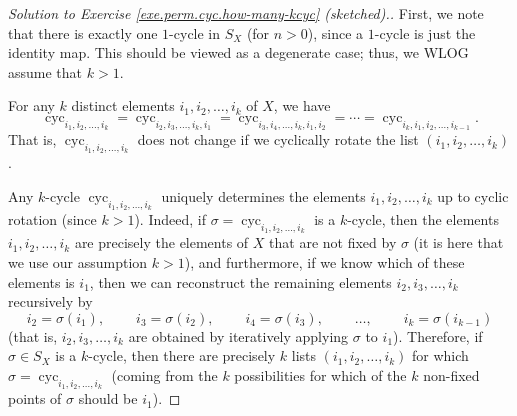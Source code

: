 \begin{proof}
[Solution to Exercise \ref{exe.perm.cyc.how-many-kcyc} (sketched).]First, we
note that there is exactly one $1$-cycle in $S_{X}$ (for $n>0$), since a
$1$-cycle is just the identity map. This should be viewed as a degenerate
case; thus, we WLOG assume that $k>1$.

For any $k$ distinct elements $i_{1},i_{2},\ldots,i_{k}$ of $X$, we have%
\[
\operatorname*{cyc}\nolimits_{i_{1},i_{2},\ldots,i_{k}}=\operatorname*{cyc}%
\nolimits_{i_{2},i_{3},\ldots,i_{k},i_{1}}=\operatorname*{cyc}\nolimits_{i_{3}%
,i_{4},\ldots,i_{k},i_{1},i_{2}}=\cdots=\operatorname*{cyc}\nolimits_{i_{k}%
,i_{1},i_{2},\ldots,i_{k-1}}.
\]
That is, $\operatorname*{cyc}\nolimits_{i_{1},i_{2},\ldots,i_{k}}$ does not
change if we cyclically rotate the list $\left(  i_{1},i_{2},\ldots
,i_{k}\right)  $.

Any $k$-cycle $\operatorname*{cyc}\nolimits_{i_{1},i_{2},\ldots,i_{k}}$
uniquely determines the elements $i_{1},i_{2},\ldots,i_{k}$ up to cyclic
rotation (since $k>1$). Indeed, if $\sigma=\operatorname*{cyc}\nolimits_{i_{1}%
,i_{2},\ldots,i_{k}}$ is a $k$-cycle, then the elements $i_{1},i_{2}%
,\ldots,i_{k}$ are precisely the elements of $X$ that are not fixed by
$\sigma$ (it is here that we use our assumption $k>1$), and furthermore, if we
know which of these elements is $i_{1}$, then we can reconstruct the remaining
elements $i_{2},i_{3},\ldots,i_{k}$ recursively by%
\[
i_{2}=\sigma\left(  i_{1}\right)  ,\ \ \ \ \ \ \ \ \ \ i_{3}=\sigma\left(
i_{2}\right)  ,\ \ \ \ \ \ \ \ \ \ i_{4}=\sigma\left(  i_{3}\right)
,\ \ \ \ \ \ \ \ \ \ \ldots,\ \ \ \ \ \ \ \ \ \ i_{k}=\sigma\left(
i_{k-1}\right)
\]
(that is, $i_{2},i_{3},\ldots,i_{k}$ are obtained by iteratively applying
$\sigma$ to $i_{1}$). Therefore, if $\sigma\in S_{X}$ is a $k$-cycle, then
there are precisely $k$ lists $\left(  i_{1},i_{2},\ldots,i_{k}\right)  $ for
which $\sigma=\operatorname*{cyc}\nolimits_{i_{1},i_{2},\ldots,i_{k}}$ (coming
from the $k$ possibilities for which of the $k$ non-fixed points of $\sigma$
should be $i_{1}$).


\end{proof}
